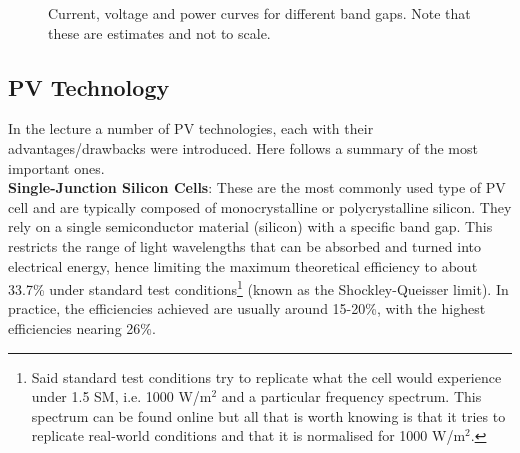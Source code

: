 \begin{figure}[h]
    \centering
    \caption{Current, voltage and power curves for different band gaps. Note
    that these are estimates and not to scale.}
    \label{fig:SQ_curves}
\end{figure}


\subsection{PV Technology}
\label{sec:PV_technology}

In the lecture a number of PV technologies, each with their advantages/drawbacks
were introduced. Here follows a summary of the most important ones.\\

\textbf{Single-Junction Silicon Cells}: These are the most commonly used type of 
PV cell and are typically composed of monocrystalline or polycrystalline silicon. 
They rely on a single semiconductor material (silicon) with a specific band gap. 
This restricts the range of light wavelengths that can be absorbed and turned 
into electrical energy, hence limiting the maximum theoretical efficiency to 
about 33.7\% under standard test conditions\footnote{Said standard test conditions
try to replicate what the cell would experience under 1.5 SM, i.e. 1000 W/m$^2$
and a particular frequency spectrum. This spectrum can be found online but all that
is worth knowing is that it tries to replicate real-world conditions and that it
is normalised for 1000 W/m$^2$.} (known as the Shockley-Queisser 
limit). In practice, the efficiencies achieved are usually around 15-20\%, with 
the highest efficiencies nearing 26\%.


